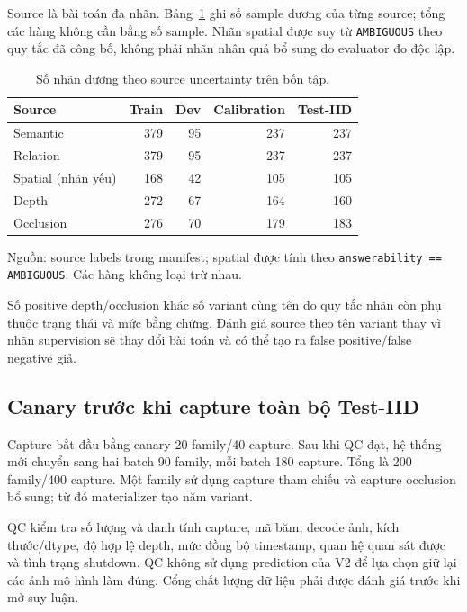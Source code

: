 Source là bài toán đa nhãn. Bảng~\ref{tab:setup-source-distribution}
ghi số sample dương của từng source; tổng các hàng không cần
bằng số sample. Nhãn spatial được suy từ \texttt{AMBIGUOUS}
theo quy tắc đã công bố, không phải nhãn nhân quả bổ sung
do evaluator đo độc lập.

\begin{table}[htbp]
    \centering
    \setlength{\tabcolsep}{4pt}
    \renewcommand{\arraystretch}{1.15}
    \caption{Số nhãn dương theo source uncertainty trên bốn tập.}
    \label{tab:setup-source-distribution}
    \small
    \begin{tabularx}{\textwidth}{@{}>{\raggedright\arraybackslash}Xrrrr@{}}
        \toprule
        Source & Train & Dev & Calibration & Test-IID \\
        \midrule
        Semantic & 379 & 95 & 237 & 237 \\
        Relation & 379 & 95 & 237 & 237 \\
        Spatial (nhãn yếu) & 168 & 42 & 105 & 105 \\
        Depth & 272 & 67 & 164 & 160 \\
        Occlusion & 276 & 70 & 179 & 183 \\
        \bottomrule
    \end{tabularx}
    \vspace{2pt}
    {\footnotesize\raggedright Nguồn: source labels trong manifest; spatial
    được tính theo \texttt{answerability == AMBIGUOUS}.
    Các hàng không loại trừ nhau.\par}
\end{table}

Số positive depth/occlusion khác số variant cùng tên do
quy tắc nhãn còn phụ thuộc trạng thái và mức bằng chứng.
Đánh giá source theo tên variant thay vì nhãn supervision
sẽ thay đổi bài toán và có thể tạo ra false positive/false
negative giả.

\subsection{Canary trước khi capture toàn bộ Test-IID}

Capture bắt đầu bằng canary 20 family/40 capture. Sau khi
QC đạt, hệ thống mới chuyển sang hai batch 90 family,
mỗi batch 180 capture. Tổng là 200 family/400 capture.
Một family sử dụng capture tham chiếu và capture
occlusion bổ sung; từ đó materializer tạo năm variant.

QC kiểm tra số lượng và danh tính capture, mã băm, decode
ảnh, kích thước/dtype, độ hợp lệ depth, mức đồng bộ timestamp,
quan hệ quan sát được và tình trạng shutdown.
QC không sử dụng prediction của V2 để lựa chọn giữ lại các
ảnh mô hình làm đúng. Cổng chất lượng dữ liệu phải được
đánh giá trước khi mở suy luận.

